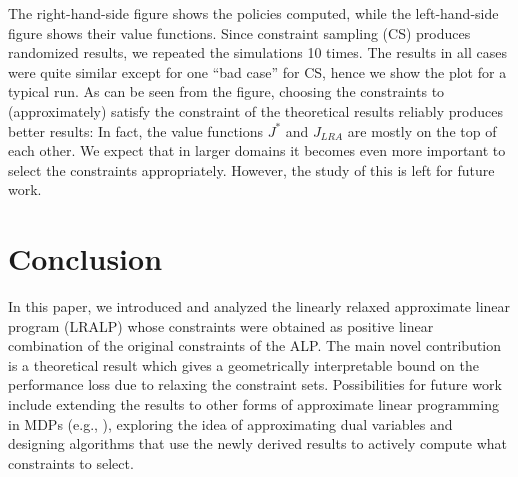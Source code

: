 \documentclass[12pt,draftcls,onecolumn]{IEEEtran}
\begin{document}
The right-hand-side figure shows the policies computed,
while the left-hand-side figure shows their value functions.
Since constraint sampling (CS) produces randomized results,
we repeated the simulations 10 times.
The results in all cases were quite similar except for one ``bad case'' for CS, hence we show the plot for a typical run.
As can be seen from the figure, choosing the constraints to (approximately) satisfy the constraint of the theoretical results
reliably produces better results: In fact, the value functions $J^*$ and $J_{LRA}$ are mostly on the top of each other.
We expect that in larger domains it becomes even more important to select the constraints appropriately.
However, the study of this is left for future work.

\section{Conclusion}
In this paper, we introduced and analyzed the linearly relaxed approximate linear program (LRALP) whose constraints were obtained as positive linear combination of the original constraints of the ALP.
The main novel contribution is a theoretical result which gives a geometrically interpretable bound on the performance loss due to relaxing the constraint sets. Possibilities for future work include extending the results to other forms of approximate linear programming in MDPs (e.g., \citep{SALP}), exploring the idea of approximating dual variables and
designing algorithms that use the newly derived results to actively compute what constraints to select. 





\printbibliography
\newpage
\onecolumn
%
\end{document}
